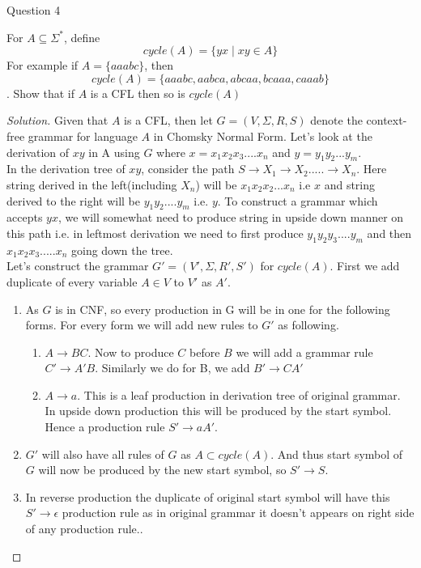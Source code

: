 \begin{solution}{Question 4}\label{ques:4}
    \begin{question}
    For $A \subseteq \Sigma^*$, define 
$$cycle(A) = \{yx \mid xy \in A\}$$
For example if $A = \{aaabc\}$, then 
$$cycle(A) = \{aaabc, aabca, abcaa, bcaaa, caaab\}$$.
Show that if $A$ is a CFL then so is $cycle(A)$
    \end{question}
    \tcblower{}
    \begin{proof}[Solution]
    Given that $A$ is a CFL, then let $G = (V, \Sigma, R, S)$ denote the context-free grammar for language $A$ in Chomsky Normal Form. Let's look at the derivation of $xy$ in A using $G$ where $x = x_1x_2x_3....x_n$ and $y = y_1y_2...y_m$.\\
    
    In the derivation tree of $xy$, consider the path $S \longrightarrow X_1 \longrightarrow X_2 ..... \longrightarrow X_n$. Here string derived in the left(including $X_n$) will be $x_1x_2x_2...x_n$ i.e $x$ and string derived to the right will be $y_1y_2....y_m$ i.e. $y$. To construct a grammar which accepts $yx$, we will somewhat need to produce string in upside down manner on this path i.e. in leftmost derivation we need to first produce $y_1y_2y_3....y_m$ and then $x_1x_2x_3.....x_n$ going down the tree.\\
    
    Let's construct the grammar  $G' = (V', \Sigma, R', S')$ for $cycle(A)$. First we add duplicate of every variable $A \in V$ to $V'$ as $A'$.
    \begin{enumerate}
        \item As $G$ is in CNF, so every production in G will be in one for the following forms. For every form we will add new rules to $G'$ as following.
            \begin{enumerate}
                \item $A \longrightarrow BC$. Now to produce $C$ before $B$ we will add a grammar rule $C' \longrightarrow A'B$. Similarly we do for B, we add $B' \longrightarrow CA'$
                \item $A \longrightarrow a$. This is a leaf production in derivation tree of original grammar. In upside down production this will be produced by the start symbol. Hence a production rule $S' \longrightarrow aA'$.
            \end{enumerate}
        \item $G'$ will also have all rules of $G$ as $A \subset cycle(A)$. And thus start symbol of $G$ will now be produced by the new start symbol, so $S' \longrightarrow S$.
        \item In reverse production the duplicate of original start symbol will have this $S' \longrightarrow \epsilon$ production rule as in original grammar it doesn't appears on right side of any production rule..
    \end{enumerate}
    

\end{proof}
\end{solution}
